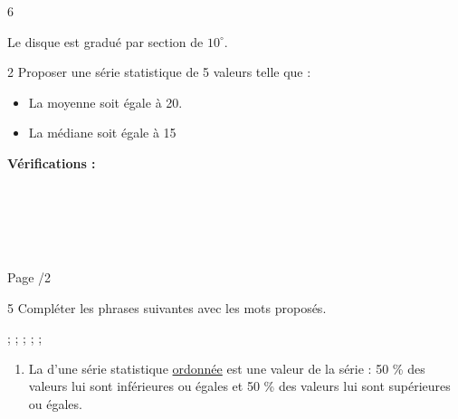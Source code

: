 \documentclass[a4paper]{book}
\begin{document}
{\begin{exerciceNote}{6}
\begin{minipage}{0.49\linewidth}
\begin{center}
                \footnotesize{Le disque est gradué par section de $10^\circ$.}
            \end{center}
        \end{minipage}
    \end{exerciceNote}


    \begin{exerciceNote}{2}
        Proposer une série statistique de 5 valeurs telle que :
        \begin{itemize}
            \item La moyenne soit égale à 20.
            \item La médiane soit égale à 15
        \end{itemize}

        \begin{center}
            \points[3] \quad \points[3] \quad \points[3] \quad \points[3] \quad \points[3] \quad
        \end{center}

        \textbf{Vérifications : }

        \points[40] \\ \points[40] \\ \points[40] \\ \points[40] \\ \points[40] 
    \end{exerciceNote}
    

\vfill
Page \thepage/2  \hfill \text{ }


\newpage
\setcounter{exo}{1}
\setcounter{page}{1}

\NomPrenom \hfill \text{ }

\TableauCompetencesQuatre
            {}
            {}
            {}
            {\CompetenceSept}
            

    \begin{exerciceNote}{5}
        Compléter les phrases suivantes avec les mots proposés.

         ;\;  ;\;  ;\;   ;\;  ;\; 

        
        \begin{enumerate}
            \item La \points[5] d'une série statistique \underline{ordonnée} est une valeur \points[5] de la série : 50 \% des valeurs lui sont inférieures ou égales et 50 \% des valeurs lui sont supérieures ou égales.


\end{enumerate}
\end{exerciceNote}}
\end{document}
